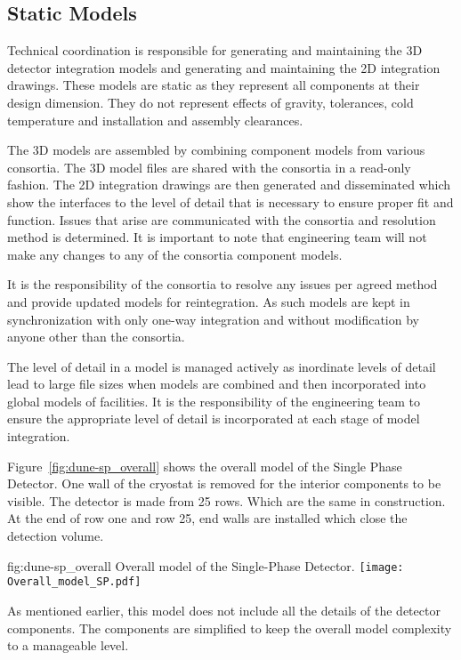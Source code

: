 \subsection{Static Models}
\label{sec:fdsp-coord-integ-static}
Technical coordination is responsible for generating and maintaining
the 3D detector integration models and generating and maintaining the
2D integration drawings. These models are static as they represent all
components at their design dimension. They do not represent effects of
gravity, tolerances, cold temperature and installation and assembly
clearances.

The 3D models are assembled by combining component models from various
consortia. The 3D model files are shared with the consortia in a
read-only fashion. The 2D integration drawings are then generated and
disseminated which show the interfaces to the level of detail that is
necessary to ensure proper fit and function. Issues that arise are
communicated with the consortia and resolution method is
determined. It is important to note that  engineering team
will not make any changes to any of the consortia component models.

It is the responsibility of the consortia to resolve any issues per
agreed method and provide updated models for reintegration. As such
models are kept in synchronization with only one-way integration and
without modification by anyone other than the consortia.

The level of detail in a model is managed actively as inordinate
levels of detail lead to large file sizes when models are combined and
then incorporated into global models of facilities. It is the
responsibility of the  engineering team to ensure the
appropriate level of detail is incorporated at each stage of model
integration.

Figure~\ref{fig:dune-sp_overall} shows the overall model of the Single
Phase Detector. One wall of the cryostat is removed for the interior
components to be visible. The detector is made from 25 rows.  Which
are the same in construction. At the end of row one and row 25, end
walls are installed which close the detection volume.
\begin{dunefigure}{fig:dune-sp_overall}
  {Overall model of the Single-Phase Detector.}
  \texttt{[image: Overall\_model\_SP.pdf]}
\end{dunefigure}


As mentioned earlier, this model does not include all the details of
the detector components. The components are simplified to keep the
overall model complexity to a manageable level.

